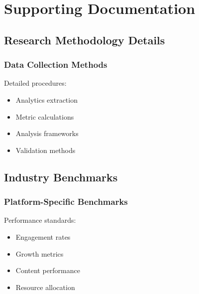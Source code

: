 \documentclass[12pt]{report}
\begin{document}
\chapter{Supporting Documentation}

\section{Research Methodology Details}
\subsection{Data Collection Methods}
Detailed procedures:
\begin{itemize}
    \item Analytics extraction
    \item Metric calculations
    \item Analysis frameworks
    \item Validation methods
\end{itemize}

\section{Industry Benchmarks}
\subsection{Platform-Specific Benchmarks}
Performance standards:
\begin{itemize}
    \item Engagement rates
    \item Growth metrics
    \item Content performance
    \item Resource allocation
\end{itemize}



\end{document}

